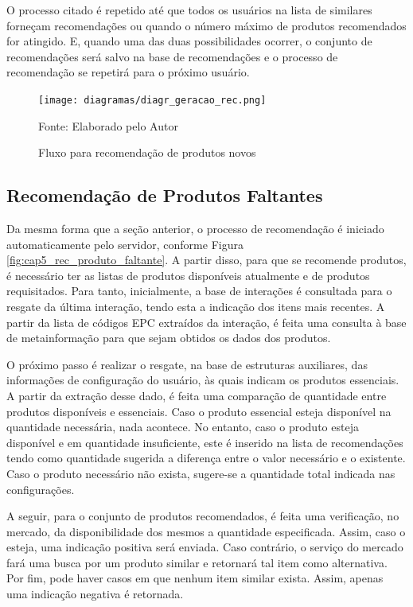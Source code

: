 O processo citado é repetido até que todos os usuários na lista de similares forneçam recomendações ou quando o número máximo de produtos recomendados for atingido. E, quando uma das duas possibilidades ocorrer, o conjunto de recomendações será salvo na base de recomendações e o processo de recomendação se repetirá para o próximo usuário.

\begin{figure}[H]
    \caption{Fluxo para recomendação de produtos novos} 
    \label{fig:cap5_diagr_geracao_rec}
    \texttt{[image: diagramas/diagr\_geracao\_rec.png]}
    
    \footnotesize{Fonte: Elaborado pelo Autor}
\end{figure}

\subsection{Recomendação de Produtos Faltantes} \label{ssec:cap5_rec_prod_falt}

Da mesma forma que a seção anterior, o processo de recomendação é iniciado automaticamente pelo servidor, conforme Figura \ref{fig:cap5_rec_produto_faltante}. A partir disso, para que se recomende produtos, é necessário ter as listas de produtos disponíveis atualmente e de produtos requisitados. Para tanto, inicialmente, a base de interações é consultada para o resgate da última interação, tendo esta a indicação dos itens mais recentes. A partir da lista de códigos EPC extraídos da interação, é feita uma consulta à base de metainformação para que sejam obtidos os dados dos produtos.

O próximo passo é realizar o resgate, na base de estruturas auxiliares, das informações de configuração do usuário, às quais indicam os produtos essenciais. A partir da extração desse dado, é feita uma comparação de quantidade entre produtos disponíveis e essenciais. Caso o produto essencial esteja disponível na quantidade necessária, nada acontece. No entanto, caso o produto esteja disponível e em quantidade insuficiente, este é inserido na lista de recomendações tendo como quantidade sugerida a diferença entre o valor necessário e o existente. Caso o produto necessário não exista, sugere-se a quantidade total indicada nas configurações.

A seguir, para o conjunto de produtos recomendados, é feita uma verificação, no mercado, da disponibilidade dos mesmos a quantidade especificada. Assim, caso o esteja, uma indicação positiva será enviada. Caso contrário, o serviço do mercado fará uma busca por um produto similar e retornará tal item como alternativa. Por fim, pode haver casos em que nenhum item similar exista. Assim, apenas uma indicação negativa é retornada.


